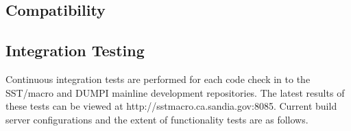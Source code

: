 \begin{appendices}


\chapter{Compatibility}
\label{sec:compatibility}

\section{Integration Testing}
\label{sec:integration}

Continuous integration tests are performed for each code check in to the SST/macro and DUMPI mainline development repositories.
The latest results of these tests can be viewed at http://sstmacro.ca.sandia.gov:8085.
Current build server configurations and the extent of functionality tests are as follows.


\end{appendices}
